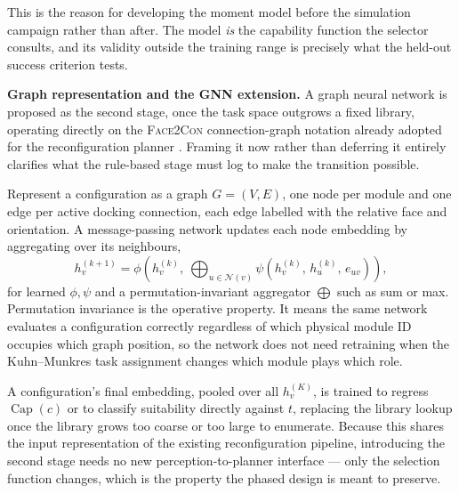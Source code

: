 \documentclass[11pt,a4paper]{article}
\newif\ifreview
\newcommand{\pending}[1]{\ifreview{\color{blue}#1}\else#1\fi}
\newcounter{gsec}
\newcounter{gsub}
\newcommand{\curgsec}{}
\newcommand{\gsep}{\texorpdfstring{\quad}{ }}
\newcommand{\gtocsub}[2]{%
  \phantomsection
  \addcontentsline{toc}{subsection}{#1\gsep #2}%
}
\newcommand{\gsubsection}[1]{%
  \refstepcounter{gsub}%
  \edef\gsublbl{\curgsec.\thegsub}%
  \expandafter\gtocsub\expandafter{\gsublbl}{#1}%
  \subsection*{\gsublbl\quad #1}%
}
\begin{document}
{This is the reason for developing the moment model before the simulation
campaign rather than after. The model \emph{is} the capability function the
selector consults, and its validity outside the training range is precisely
what the held-out success criterion tests.

\noindent\textbf{Graph representation and the GNN extension.} A graph neural
network is proposed as the second stage, once the task space outgrows a fixed
library, operating directly on the \textsc{Face2Con} connection-graph notation
already adopted for the reconfiguration planner \cite{liu2017}. Framing it now
rather than deferring it entirely clarifies what the rule-based stage must log
to make the transition possible.

Represent a configuration as a graph $G = (V,E)$, one node per module and one
edge per active docking connection, each edge labelled with the relative face
and orientation. A message-passing network updates each node embedding by
aggregating over its neighbours,
\begin{equation}
  h_v^{(k+1)} = \phi\!\left(h_v^{(k)},\ \bigoplus_{u \in \mathcal{N}(v)}
    \psi\!\left(h_v^{(k)},\, h_u^{(k)},\, e_{uv}\right)\right),
  \label{eq:gnn}
\end{equation}
for learned $\phi,\psi$ and a permutation-invariant aggregator $\bigoplus$ such
as sum or max. Permutation invariance is the operative property. It means the
same network evaluates a configuration correctly regardless of which physical
module ID occupies which graph position, so the network does not need
retraining when the Kuhn--Munkres task assignment changes which module plays
which role.

A configuration's final embedding, pooled over all $h_v^{(K)}$, is trained to
regress $\operatorname{Cap}(c)$ or to classify suitability directly against
$t$, replacing the library lookup once the library grows too coarse or too
large to enumerate. Because this shares the input representation of the
existing reconfiguration pipeline, introducing the second stage needs no new
perception-to-planner interface --- only the selection function changes, which
is the property the phased design is meant to preserve.
}

\pending{}
\end{document}
